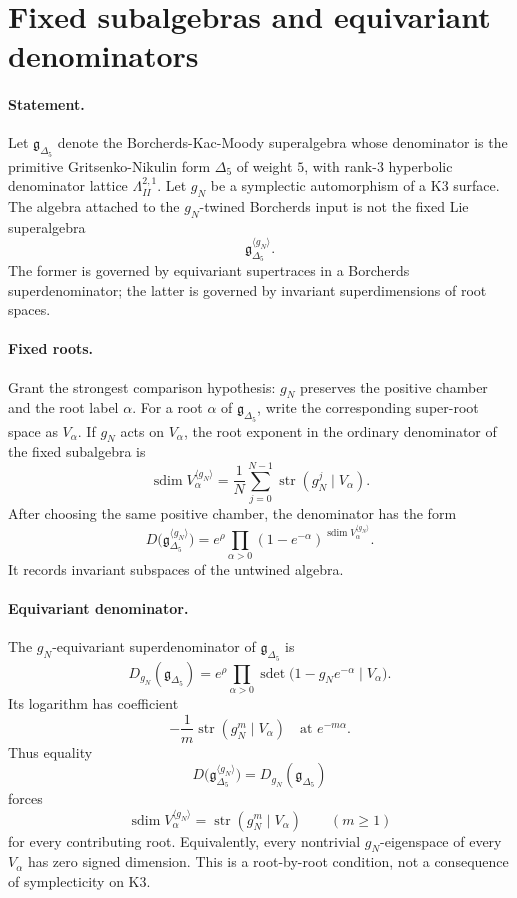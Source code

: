 
\providecommand{\fg}{\mathfrak{g}}
\providecommand{\fgN}{\fg^{(N)}}
\providecommand{\fgDel}{\fg_{\Delta_5}}
\providecommand{\kBKM}{\kappa_{\mathrm{BKM}}}
\providecommand{\kch}{\kappa_{\mathrm{ch}}}
\providecommand{\kcat}{\kappa_{\mathrm{cat}}}
\providecommand{\kfib}{\kappa_{\mathrm{fiber}}}

\section{Fixed subalgebras and equivariant denominators}
\label{sec:fixed-subalgebra-twined-borcherds}

\paragraph{Statement.}
Let $\fgDel$ denote the Borcherds-Kac-Moody superalgebra whose
denominator is the primitive Gritsenko-Nikulin form $\Delta_5$ of
weight $5$, with rank-$3$ hyperbolic denominator lattice
$\Lambda^{2,1}_{II}$. Let $g_N$ be a symplectic automorphism of a K3
surface. The algebra attached to the $g_N$-twined Borcherds input is
not the fixed Lie superalgebra
\[
  \fgDel^{\langle g_N\rangle}.
\]
The former is governed by equivariant supertraces in a Borcherds
superdenominator; the latter is governed by invariant superdimensions
of root spaces.

\paragraph{Fixed roots.}
Grant the strongest comparison hypothesis: $g_N$ preserves the positive
chamber and the root label $\alpha$.
For a root $\alpha$ of $\fgDel$, write the corresponding super-root
space as $V_\alpha$. If $g_N$ acts on $V_\alpha$, the root exponent in
the ordinary denominator of the fixed subalgebra is
\[
  \operatorname{sdim} V_\alpha^{\langle g_N\rangle}
  =
  \frac{1}{N}
  \sum_{j=0}^{N-1}
  \operatorname{str}(g_N^j\mid V_\alpha).
\]
After choosing the same positive chamber, the denominator has the form
\[
  D\bigl(\fgDel^{\langle g_N\rangle}\bigr)
  =
  e^\rho
  \prod_{\alpha>0}
  (1-e^{-\alpha})^{\operatorname{sdim}V_\alpha^{\langle g_N\rangle}}.
\]
It records invariant subspaces of the untwined algebra.

\paragraph{Equivariant denominator.}
The $g_N$-equivariant superdenominator of $\fgDel$ is
\[
  D_{g_N}(\fgDel)
  =
  e^\rho
  \prod_{\alpha>0}
  \operatorname{sdet}\bigl(1-g_Ne^{-\alpha}\mid V_\alpha\bigr).
\]
Its logarithm has coefficient
\[
  -\frac{1}{m}\operatorname{str}(g_N^m\mid V_\alpha)
  \quad\text{at }e^{-m\alpha}.
\]
Thus equality
\[
  D\bigl(\fgDel^{\langle g_N\rangle}\bigr)=D_{g_N}(\fgDel)
\]
forces
\[
  \operatorname{sdim}V_\alpha^{\langle g_N\rangle}
  =
  \operatorname{str}(g_N^m\mid V_\alpha)
  \qquad (m\geq 1)
\]
for every contributing root. Equivalently, every nontrivial
$g_N$-eigenspace of every $V_\alpha$ has zero signed dimension. This is
a root-by-root condition, not a consequence of symplecticity on K3.

